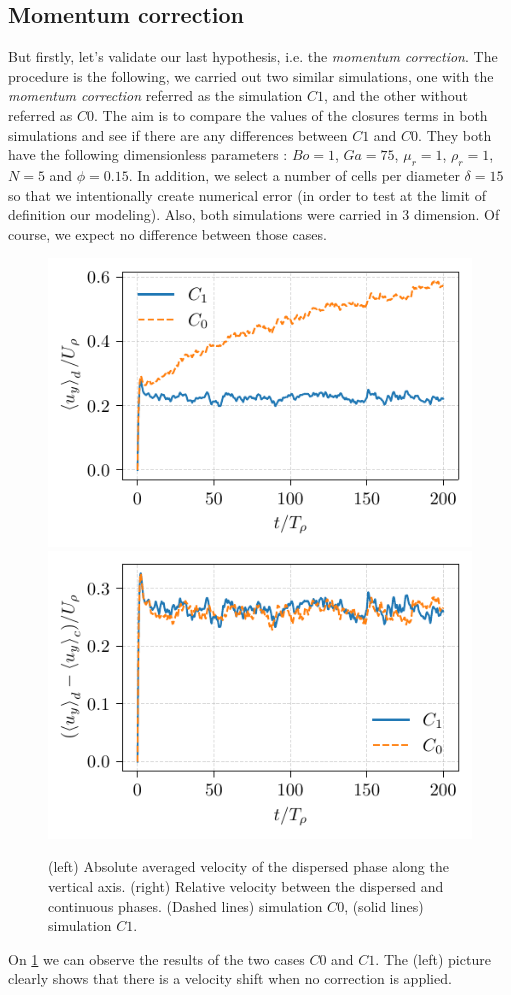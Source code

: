 \subsection{Momentum correction}
But firstly, let's validate our last hypothesis, i.e. the \textit{momentum correction}. 
The procedure is the following, we carried out two similar simulations, one with the \textit{momentum correction} referred as the simulation $C1$, and the other without referred as $C0$.
The aim is to compare the values of the closures terms in both simulations and see if there are any differences between $C1$ and $C0$. 
They both have the following dimensionless parameters : 
$Bo = 1$, $Ga = 75$, $\mu_r  =1$, $\rho_r = 1$, $N = 5$ and $\phi = 0.15$. 
In addition, we select a number of cells per diameter $\delta = 15$ so that we intentionally create numerical error (in order to test at the limit of definition our modeling).
Also, both simulations were carried in 3 dimension. 
Of course, we expect no difference between those cases. 
\begin{figure}[h!]
    \centering
    \includegraphics[height= 0.3\textwidth]{image/VALIDATION/C0C1/Ud.pdf}
    \includegraphics[height= 0.3\textwidth]{image/VALIDATION/C0C1/DeltaU.pdf}
    \caption{(left) Absolute averaged velocity of the dispersed phase along the vertical axis.
            (right) Relative velocity between the dispersed and continuous phases.
            (Dashed lines) simulation $C0$,
            (solid lines) simulation $C1$.  }
    \label{fig:VALIDATION_C0C1_1}
\end{figure}
On \ref{fig:VALIDATION_C0C1_1} we can observe the results of the two cases $C0$ and $C1$.
The (left) picture clearly shows that there is a velocity shift when no correction is applied.
